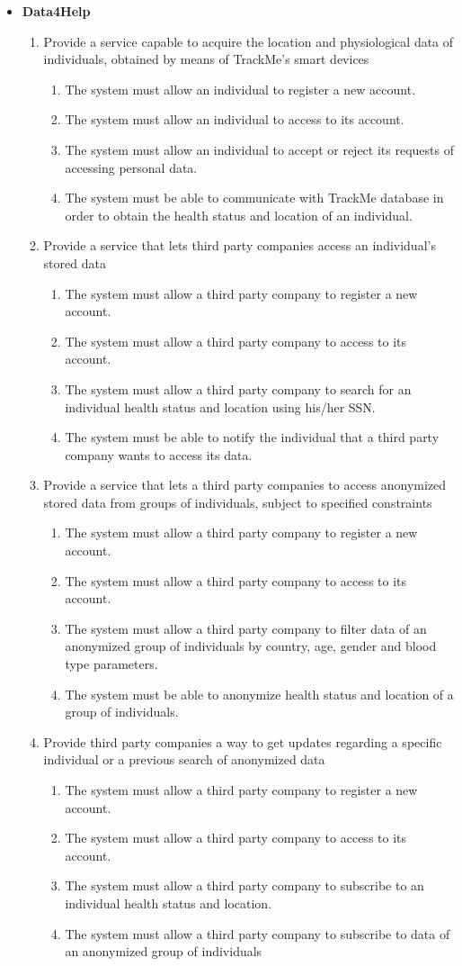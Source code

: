\documentclass[12pt]{article}
\newcommand\requirement[1]{\item[{[R#1]}] }
\newcommand\goal[1]{\item[{[G#1]}] }
\begin{document}
\begin{itemize}
  \item{\textbf{Data4Help}}
  \begin{enumerate}
    \goal{1} Provide a service capable to acquire the location and physiological data of individuals, obtained by means of TrackMe's smart devices
    \begin{enumerate}
      \requirement{1} The system must allow an individual to register a new account.
      \requirement{2} The system must allow an individual to access to its account.
      \requirement{3} The system must allow an individual to accept or reject its requests of accessing personal data.
      \requirement{4} The system must be able to communicate with TrackMe database in order to obtain the health status and location of an individual.
    \end{enumerate}
    
    \goal{2} Provide a service that lets third party companies access an individual's stored data 
    \begin{enumerate}
      \requirement{5} The system must allow a third party company to register a new account.
      \requirement{6} The system must allow a third party company to access to its account.
      \requirement{7} The system must allow a third party company to search for an individual health status and location using his/her SSN.
      \requirement{8} The system must be able to notify the individual that a third party company wants to access its data.
    \end{enumerate}
    
    \goal{3} Provide a service that lets a third party companies to access anonymized stored data from groups of individuals, subject to specified constraints
    \begin{enumerate}
      \requirement{5} The system must allow a third party company to register a new account.
      \requirement{6} The system must allow a third party company to access to its account.
      \requirement{9} The system must allow a third party company to filter data of an anonymized group of individuals by country, age, gender and blood type parameters.
      \requirement{10} The system must be able to anonymize health status and location of a group of individuals.
    \end{enumerate}
    
    \goal{4} Provide third party companies a way to get updates regarding a specific individual or a previous search of anonymized data
    \begin{enumerate}
      \requirement{5} The system must allow a third party company to register a new account.
      \requirement{6} The system must allow a third party company to access to its account.
      \requirement{11} The system must allow a third party company to subscribe to an individual health status and location.
      \requirement{12} The system must allow a third party company to subscribe to data of an anonymized group of individuals
    \end{enumerate}
  \end{enumerate}
  

\end{itemize}
\end{document}
